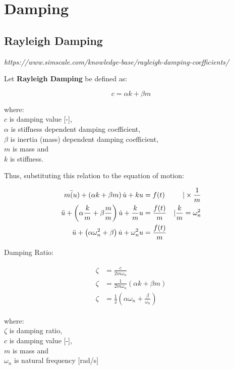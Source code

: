 \documentclass[10pt,b5paper,titlepage]{book}
\newenvironment{ematrix}
{
    \begin{eqnarray}
        \begin{aligned}
}
{
        \end{aligned}
    \end{eqnarray}
}
\begin{document}
\section{Damping}

\subsection{Rayleigh Damping}
\textit{https://www.simscale.com/knowledge-base/rayleigh-damping-coefficients/}

Let \textbf{Rayleigh Damping} be defined as:

\begin{equation}
    c = \alpha k + \beta m
\end{equation}

where:\\
$ c $ is damping value [-],\\
$ \alpha $ is stiffness dependent damping coefficient,\\
$ \beta $ is inertia (mass) dependent damping coefficient,\\
$ m $ is mass and\\
$ k $ is stiffness.

Thus, substituting this relation to the equation of motion:

\begin{ematrix}
    m \ddot(u) + \left(\alpha k + \beta m \right) \dot{u} + k u &= f(t) & \space \vert \times \frac{1}{m}\\
    \ddot{u} + \left(\alpha \frac{k}{m} + \beta \frac{m}{m} \right) \dot{u} + \frac{k}{m} u
    &= \frac{f(t)}{m} & \space \vert \frac{k}{m} = \omega_n^2 \\
    \ddot{u} + \left(\alpha \omega_n^2 + \beta \right) \dot{u} + \omega_n^2 u &= \frac{f(t)}{m} & \space
\end{ematrix}

Damping Ratio:

\begin{ematrix}
    \zeta &= \frac{c}{2 m \omega_n}\\
    \zeta &= \frac{1}{2 m \omega_n} \left( \alpha k + \beta m \right)\\
    \zeta &= \frac{1}{2} \left( \alpha \omega_n + \frac{\beta}{\omega_n} \right)
\end{ematrix}

where:\\
$ \zeta $ is damping ratio,\\
$ c $ is damping value [-],\\
$ m $ is mass and\\
$ \omega_n $ is natural frequency [rad/s]
\end{document}
